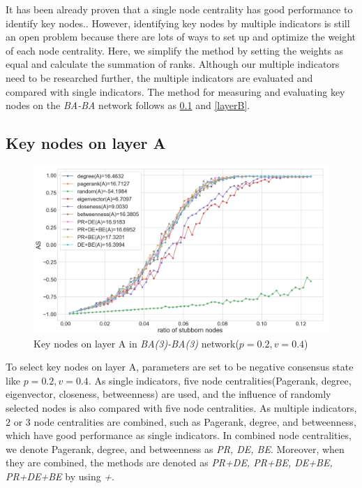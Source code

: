 It has been already proven that a single node centrality has good performance to identify key nodes.\parencite{koschutzki2008, francisco2019, bianconi2018}. However, identifying key nodes by multiple indicators is still an open problem because there are lots of ways to set up and optimize the weight of each node centrality.\parencite{huang2014}  Here, we simplify the method by setting the weights as equal and calculate the summation of ranks. Although our multiple indicators need to be researched further, the multiple indicators are evaluated and compared with single indicators. The method for measuring and evaluating key nodes on the \textit{BA-BA} network follows as \ref{layerA} and \ref{layerB}.\\
 
\subsection{Key nodes on layer A}
\label{layerA}
\begin{figure}[!htb]
	\centering
	\includegraphics[width=\hsize]{figure/chap5_keynode_A.png}
	\caption{Key nodes on layer A in \textit{BA(3)-BA(3)} network($p=0.2, v=0.4$)}
	\label{chap5_keynode_A}
\end{figure}
To select key nodes on layer A, parameters are set to be negative consensus state like $p=0.2, v=0.4$.  As single indicators, five node centralities(Pagerank, degree, eigenvector, closeness, betweenness) are used, and the influence of randomly selected nodes is also compared with five node centralities. As multiple indicators, $2$ or $3$ node centralities are combined, such as Pagerank, degree, and betweenness, which have good performance as single indicators. In combined node centralities, we denote Pagerank, degree, and betweenness as \textit{PR, DE, BE}. Moreover, when they are combined, the methods are denoted as \textit{PR+DE, PR+BE, DE+BE, PR+DE+BE} by using \textit{+}. 

